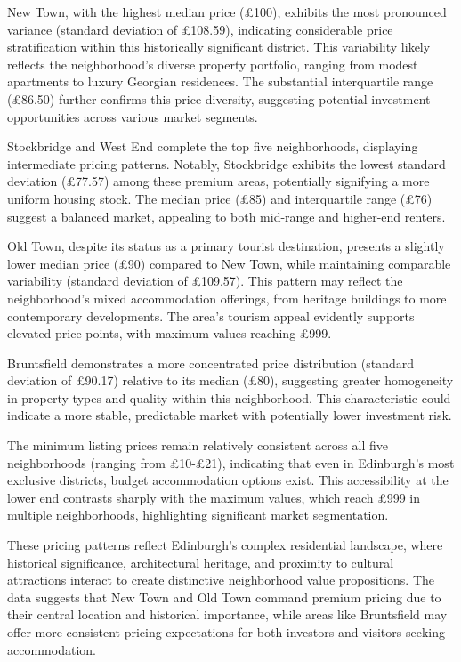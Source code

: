 \documentclass[
]{article}
\begin{document}
New Town, with the highest median price (£100), exhibits the most
pronounced variance (standard deviation of £108.59), indicating
considerable price stratification within this historically significant
district. This variability likely reflects the neighborhood's diverse
property portfolio, ranging from modest apartments to luxury Georgian
residences. The substantial interquartile range (£86.50) further
confirms this price diversity, suggesting potential investment
opportunities across various market segments.

Stockbridge and West End complete the top five neighborhoods, displaying
intermediate pricing patterns. Notably, Stockbridge exhibits the lowest
standard deviation (£77.57) among these premium areas, potentially
signifying a more uniform housing stock. The median price (£85) and
interquartile range (£76) suggest a balanced market, appealing to both
mid-range and higher-end renters.

Old Town, despite its status as a primary tourist destination, presents
a slightly lower median price (£90) compared to New Town, while
maintaining comparable variability (standard deviation of £109.57). This
pattern may reflect the neighborhood's mixed accommodation offerings,
from heritage buildings to more contemporary developments. The area's
tourism appeal evidently supports elevated price points, with maximum
values reaching £999.

Bruntsfield demonstrates a more concentrated price distribution
(standard deviation of £90.17) relative to its median (£80), suggesting
greater homogeneity in property types and quality within this
neighborhood. This characteristic could indicate a more stable,
predictable market with potentially lower investment risk.

The minimum listing prices remain relatively consistent across all five
neighborhoods (ranging from £10-£21), indicating that even in
Edinburgh's most exclusive districts, budget accommodation options
exist. This accessibility at the lower end contrasts sharply with the
maximum values, which reach £999 in multiple neighborhoods, highlighting
significant market segmentation.

These pricing patterns reflect Edinburgh's complex residential
landscape, where historical significance, architectural heritage, and
proximity to cultural attractions interact to create distinctive
neighborhood value propositions. The data suggests that New Town and Old
Town command premium pricing due to their central location and
historical importance, while areas like Bruntsfield may offer more
consistent pricing expectations for both investors and visitors seeking
accommodation.
\end{document}
